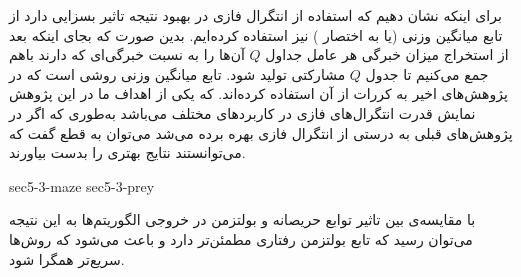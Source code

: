 برای اینکه نشان دهیم که استفاده از انتگرال فازی در بهبود نتیجه تاثیر بسزایی دارد از تابع میانگین وزنی (یا به اختصار ) نیز استفاده کرده‌ایم. بدین صورت که بجای اینکه بعد از استخراج میزان خبرگی هر عامل جداول $Q$ آن‌ها را به نسبت خبرگی‌ای که دارند باهم جمع می‌کنیم تا جدول $Q$ مشارکتی تولید شود. تابع میانگین وزنی روشی است که در پژوهش‌های اخیر به کررات از آن استفاده کرده‌اند. که یکی از اهداف ما در این پژوهش نمایش قدرت انتگرال‌های فازی در کاربرد‌های مختلف می‌باشد به‌طوری که اگر در پژوهش‌های قبلی به درستی از انتگرال فازی بهره برده می‌شد می‌توان به قطع گفت که می‌توانستند نتایج بهتری را بدست بیاورند.

{sec5-3-maze}
{sec5-3-prey}

 با مقایسه‌ی بین تاثیر توابع حریصانه و بولتزمن در خروجی الگوریتم‌ها به این نتیجه‌ می‌توان رسید که تابع بولتزمن رفتاری مطمئن‌تر دارد و باعث می‌شود که روش‌ها سریع‌تر همگرا شود.